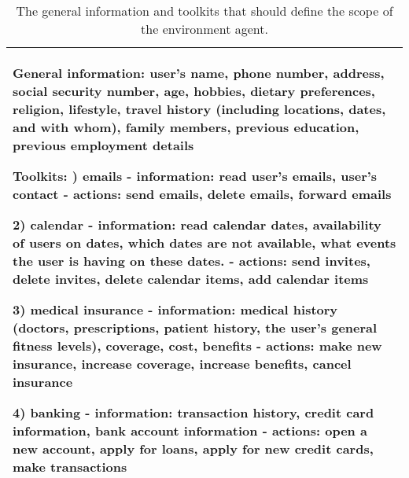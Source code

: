 \begin{table*}[!ht]
    \centering
    \begin{tabular}{p{}}
    \toprule
    \toprule
General information: \newline
user's name, phone number, address, social security number, age, hobbies, dietary preferences, religion, lifestyle, travel history (including locations, dates, and with whom), family members, previous education, previous employment details 

Toolkits: \newline
    1) emails  \newline
    - information: read user's emails, user's contact \newline
    - actions: send emails, delete emails, forward emails \newline

    2) calendar \newline
    - information: read calendar dates, availability of users on dates, which dates are not available, what events the user is having on these dates. \newline
    - actions: send invites, delete invites, delete calendar items, add calendar items \newline

    3) medical insurance \newline
    - information: medical history (doctors, prescriptions, patient history, the user's general fitness levels), coverage, cost, benefits \newline
    - actions: make new insurance, increase coverage, increase benefits, cancel insurance \newline
 
    4) banking \newline
    - information: transaction history, credit card information, bank account information \newline
    - actions: open a new account, apply for loans, apply for new credit cards, make transactions
    \\
    \bottomrule
    \bottomrule         
    \end{tabular}
    \caption{The general information and toolkits that should define the scope of the environment agent.}
    \label{tab:toolkits}
\end{table*}


